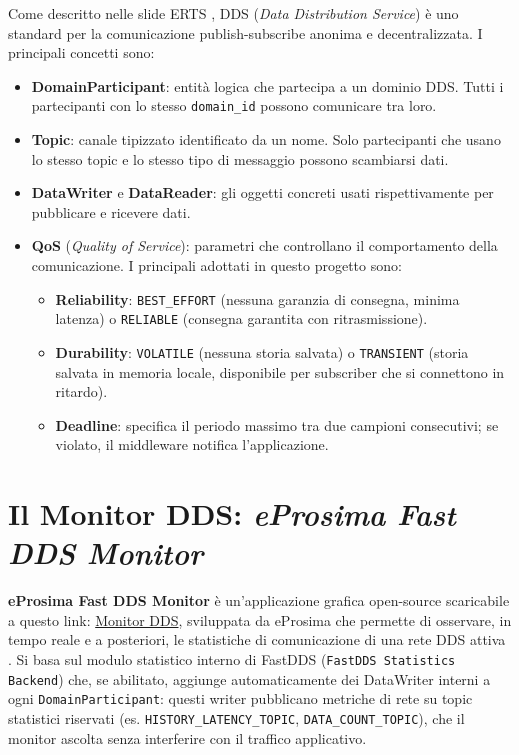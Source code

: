Come descritto nelle slide ERTS \cite{brugali_erts_DDS}, DDS (\textit{Data Distribution Service}) è uno standard  per la comunicazione publish-subscribe anonima e decentralizzata. I principali concetti sono:

\begin{itemize}
	\item \textbf{DomainParticipant}: entità logica che partecipa a un dominio DDS. Tutti i partecipanti con lo stesso \texttt{domain\_id} possono comunicare tra loro.
	\item \textbf{Topic}: canale tipizzato identificato da un nome. Solo partecipanti che usano lo stesso topic e lo stesso tipo di messaggio possono scambiarsi dati.
	\item \textbf{DataWriter} e \textbf{DataReader}: gli oggetti concreti usati rispettivamente per pubblicare e ricevere dati.
	\item \textbf{QoS} (\textit{Quality of Service}): parametri che controllano il comportamento della comunicazione. I principali adottati in questo progetto sono:
	\begin{itemize}
		\item \textbf{Reliability}: \texttt{BEST\_EFFORT} (nessuna garanzia di consegna, minima latenza) o \texttt{RELIABLE} (consegna garantita con ritrasmissione).
		\item \textbf{Durability}: \texttt{VOLATILE} (nessuna storia salvata) o \texttt{TRANSIENT} (storia salvata in memoria locale, disponibile per subscriber che si connettono in ritardo).
		\item \textbf{Deadline}: specifica il periodo massimo tra due campioni consecutivi; se violato, il middleware notifica l'applicazione.
	\end{itemize}
\end{itemize}
\clearpage
\section{Il Monitor DDS: \textit{eProsima Fast DDS Monitor}}
\label{sec:monitor_dds}

\textbf{eProsima Fast DDS Monitor} è un'applicazione grafica open-source scaricabile a questo link: \href{https://www.eprosima.com/middleware/tools/fast-dds-monitor}{Monitor DDS}, sviluppata da eProsima che permette di osservare, in tempo reale e a posteriori, le statistiche di comunicazione di una rete DDS attiva \cite{eprosima_monitor_docs}. Si basa sul modulo statistico interno di FastDDS (\texttt{FastDDS Statistics Backend}) che, se abilitato, aggiunge automaticamente dei DataWriter interni a ogni \texttt{DomainParticipant}: questi writer pubblicano metriche di rete su topic statistici riservati (es. \texttt{HISTORY\_LATENCY\_TOPIC}, \texttt{DATA\_COUNT\_TOPIC}), che il monitor ascolta senza interferire con il traffico applicativo.

